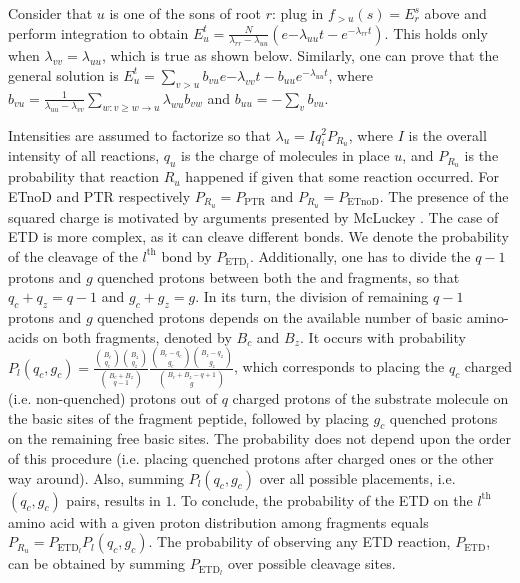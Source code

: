 \documentclass{llncs}
\begin{document}
        Consider that $u$ is one of the sons of root $r$: plug in $f_{>u}(s)=E_r^s$ above and perform integration to obtain $E_u^t= \frac{N}{\lambda_{rr}-\lambda_{uu}}(e{-\lambda_{uu}t}-e^{-\lambda_{rr}t})$.
        This holds only when $\lambda_{vv}=\lambda_{uu}$, which is true as shown below.
        Similarly, one can prove that the general solution is $E_u^t=\sum_{v>u}b_{vu}e{-\lambda_{vv}t}-b_{uu}e^{-\lambda_{uu}t}$, where $b_{vu}= \frac{1}{\lambda_{uu}-\lambda_{vv}} \sum_{w: v\geq w \rightarrow u} \lambda_{wu}b_{vw}$ and  $b_{uu}=-\sum_v b_{vu}.$

        Intensities are assumed to factorize  so that $\lambda_u = I q_i^2 P_{R_u}$, where $I$ is the overall intensity of all reactions, $q_u$ is the charge of molecules in place $u$, and $P_{R_u}$ is the probability that reaction $R_u$ happened if given that some reaction occurred. For ETnoD and PTR respectively $P_{R_u}=P_\text{PTR}$ and $P_{R_u}=P_\text{ETnoD}$. The presence of the squared charge is motivated by arguments presented by McLuckey \cite{McLuckey1999-su}.
        The case of ETD is more complex, as it can cleave different bonds. We denote the probability of the cleavage of the $l^\text{th}$ bond by $P_{\text{ETD}_l}$. Additionally, one has to divide the $q-1$ protons and $g$ quenched protons between both the  and  fragments, so that $q_c+q_z=q-1$ and $g_c+g_z = g$. In its turn, the division of remaining $q-1$ protons and $g$ quenched protons depends on the available number of basic amino-acids on both fragments, denoted by $B_c$ and $B_z$. It occurs with probability $P_l(q_c, g_c) = \frac{ \binom{B_c}{q_c}\binom{B_z}{q_z} }{ \binom{B_c+B_z}{q-1} } \frac{ \binom{B_c - q_c}{g_c} \binom{B_z-q_z}{g_z} }{ \binom{B_c+B_z-q+1}{g} }$,
        which corresponds to placing the $q_c$ charged (i.e. non-quenched) protons out of $q$ charged protons of the substrate molecule on the basic sites of the fragment peptide, followed by placing $g_c$ quenched protons on the remaining free basic sites. The probability does not depend upon the order of this procedure (i.e. placing quenched protons after charged ones or the other way around). Also, summing $P_l(q_c, g_c)$ over all possible placements, i.e. $(q_c, g_c)$ pairs, results in $1$. To conclude, the probability of the ETD on the $l^\text{th}$ amino acid with a given proton distribution among fragments equals $P_{R_u}=P_{\text{ETD}_l} P_l(q_c, g_c)$. The probability of observing any ETD reaction, $P_\text{ETD}$, can be obtained by summing $P_{\text{ETD}_l}$ over possible cleavage sites.
\end{document}
